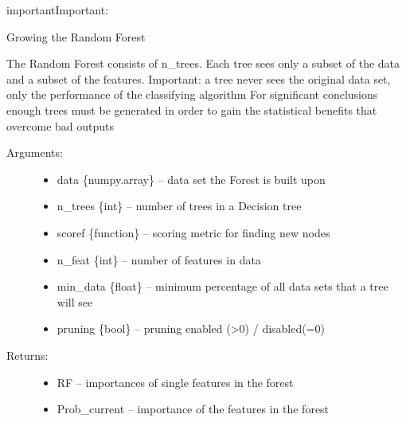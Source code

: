 \documentclass[letterpaper,10pt,english]{sphinxmanual}
\begin{document}
\begin{sphinxadmonition}{important}{Important:}
\label{\detokenize{RF:buildforest}}

\begin{fulllineitems}
\label{\detokenize{RF:ForestFire.Main.buildforest}}
Growing the Random Forest

The Random Forest consists of n\_trees. Each tree sees only a subset of the data and a subset of the features.
Important: a tree never sees the original data set, only the performance of the classifying algorithm
For significant conclusions enough trees must be generated in order to gain the statistical benefits that overcome bad outputs
\begin{description}
\item[{Arguments:}] \leavevmode\begin{itemize}
\item {} 
data \{numpy.array\} -- data set the Forest is built upon

\item {} 
n\_trees \{int\} -- number of trees in a Decision tree

\item {} 
scoref \{function\} -- scoring metric for finding new nodes

\item {} 
n\_feat \{int\} -- number of features in data

\item {} 
min\_data \{float\} -- minimum percentage of all data sets that a tree will see

\item {} 
pruning \{bool\} -- pruning enabled (\textgreater{}0) / disabled(=0)

\end{itemize}

\item[{Returns:}] \leavevmode\begin{itemize}
\item {} 
RF -- importances of single features in the forest

\item {} 
Prob\_current -- importance of the features in the forest


\end{itemize}
\end{description}
\end{fulllineitems}
\end{sphinxadmonition}
\end{document}
